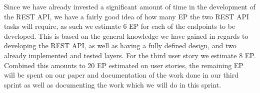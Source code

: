 \bigskip \noindent
Since we have already invested a significant amount of time in the development of the REST API, we have a fairly good idea of how many EP the two REST API tasks will require, as such we estimate 6 EP for each of the endpoints to be developed.
This is based on the general knowledge we have gained in regards to developing the REST API, as well as having a fully defined design, and two already implemented and tested layers.%
For the third user story we estimate 8 EP.
Combined this amounts to 20 EP estimated on user stories, the remaining EP will be spent on our paper and documentation of the work done in our third sprint as well as documenting the work which we will do in this sprint.
